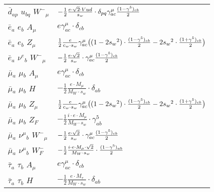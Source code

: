 \begin{center}
\begin{tabular}{|l|l|}
$\bar{d}{}_{a p }$ \phantom{-} $u{}_{b q }$ \phantom{-} $W^-{}_{\mu }$ \phantom{-}  &
	$-\frac{1}{2}\frac{ e \cdot\sqrt{2} \cdot Vud}{ s_w}\cdot \delta_{p q} \gamma_{a c}^\mu {(1-\gamma^5)_{c b}\over 2} $\\[2mm]
$\bar{e}{}_{a }$ \phantom{-} $e{}_{b }$ \phantom{-} ${A}_{\mu }$ \phantom{-}  &
	$ e\gamma_{a c}^\mu \cdot \delta_{c b} $\\[2mm]
$\bar{e}{}_{a }$ \phantom{-} $e{}_{b }$ \phantom{-} ${Z}_{\mu }$ \phantom{-}  &
	$\frac{1}{2}\frac{ e}{ c_w \cdot s_w}\gamma_{a c}^\mu \big( (1-2 s_w {}^2)\cdot {(1-\gamma^5)_{c b}\over 2} -2 s_w{}^2 \cdot {(1+\gamma^5)_{c b}\over 2} \big)$\\[2mm]
$\bar{e}{}_{a }$ \phantom{-} $\nu^e{}_{b }$ \phantom{-} $W^-{}_{\mu }$ \phantom{-}  &
	$-\frac{1}{2}\frac{ e \cdot\sqrt{2}}{ s_w}\cdot \gamma_{a c}^\mu {(1-\gamma^5)_{c b}\over 2} $\\[2mm]
$\bar{\mu}{}_{a }$ \phantom{-} $\mu{}_{b }$ \phantom{-} ${A}_{\mu }$ \phantom{-}  &
	$ e\gamma_{a c}^\mu \cdot \delta_{c b} $\\[2mm]
$\bar{\mu}{}_{a }$ \phantom{-} $\mu{}_{b }$ \phantom{-} ${H}_{}$ \phantom{-}  &
	$-\frac{1}{2}\frac{ e \cdot M_\mu}{ M_W \cdot s_w}\cdot \delta_{a b} $\\[2mm]
$\bar{\mu}{}_{a }$ \phantom{-} $\mu{}_{b }$ \phantom{-} ${Z}_{\mu }$ \phantom{-}  &
	$\frac{1}{2}\frac{ e}{ c_w \cdot s_w}\gamma_{a c}^\mu \big( (1-2 s_w {}^2)\cdot {(1-\gamma^5)_{c b}\over 2} -2 s_w{}^2 \cdot {(1+\gamma^5)_{c b}\over 2} \big)$\\[2mm]
$\bar{\mu}{}_{a }$ \phantom{-} $\mu{}_{b }$ \phantom{-} $Z_F{}_{}$ \phantom{-}  &
	$-\frac{1}{2}\frac{ i \cdot e \cdot M_\mu}{ M_W \cdot s_w}\cdot \gamma_{a b}^5 $\\[2mm]
$\bar{\mu}{}_{a }$ \phantom{-} $\nu^\mu{}_{b }$ \phantom{-} $W^-{}_{\mu }$ \phantom{-}  &
	$-\frac{1}{2}\frac{ e \cdot\sqrt{2}}{ s_w}\cdot \gamma_{a c}^\mu {(1-\gamma^5)_{c b}\over 2} $\\[2mm]
$\bar{\mu}{}_{a }$ \phantom{-} $\nu^\mu{}_{b }$ \phantom{-} $W^-_F{}_{}$ \phantom{-}  &
	$-\frac{1}{2}\frac{ i \cdot e \cdot M_\mu \cdot\sqrt{2}}{ M_W \cdot s_w}\cdot {(1-\gamma^5)_{a b}\over 2} $\\[2mm]
$\bar{\tau}{}_{a }$ \phantom{-} $\tau{}_{b }$ \phantom{-} ${A}_{\mu }$ \phantom{-}  &
	$ e\gamma_{a c}^\mu \cdot \delta_{c b} $\\[2mm]
$\bar{\tau}{}_{a }$ \phantom{-} $\tau{}_{b }$ \phantom{-} ${H}_{}$ \phantom{-}  &
	$-\frac{1}{2}\frac{ e \cdot M_\tau}{ M_W \cdot s_w}\cdot \delta_{a b} $\\[2mm]

\end{tabular}
\end{center}
